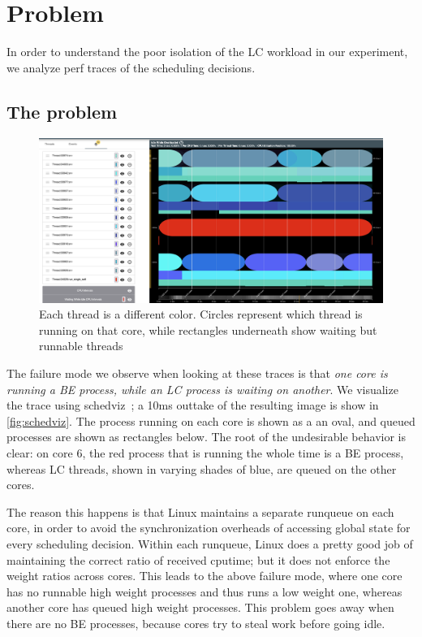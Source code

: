 \section{Problem}\label{s:problem}

In order to understand the poor isolation of the LC workload in our experiment,
we analyze perf traces of the scheduling decisions.

\subsection{The problem}

\begin{figure}[t]
    \centering
    \includegraphics[width=\columnwidth]{graphs/schedviz.png}
    \caption{Each thread is a different color. Circles represent which
    thread is running on that core, while rectangles underneath show waiting but
    runnable threads
    }\label{fig:schedviz}
\end{figure}

The failure mode we observe when looking at these traces is that \textit{one
core is running a BE process, while an LC process is waiting on another}. We
visualize the trace using schedviz~\cite{TODO}; a 10ms outtake of the resulting
image is show in \autoref{fig:schedviz}. The process running on each core is
shown as a an oval, and queued processes are shown as rectangles below. The root
of the undesirable behavior is clear: on core 6, the red process that is running
the whole time is a BE process, whereas LC threads, shown in varying shades of
blue, are queued on the other cores.

The reason this happens is that Linux maintains a separate runqueue on each
core, in order to avoid the synchronization overheads of accessing global state
for every scheduling decision. Within each runqueue, Linux does a pretty good
job of maintaining the correct ratio of received cputime; but it does not
enforce the weight ratios across cores. This leads to the above failure mode,
where one core has no runnable high weight processes and thus runs a low weight
one, whereas another core has queued high weight processes. This problem goes
away when there are no BE processes, because cores try to steal work before
going idle.

